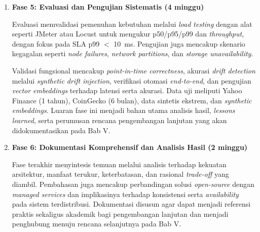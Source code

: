 \begin{enumerate}
    \vspace{0.5em}

    \item \textbf{Fase 5: Evaluasi dan Pengujian Sistematis (4 minggu)}
    
    Evaluasi memvalidasi pemenuhan kebutuhan melalui \textit{load testing} dengan alat seperti JMeter atau Locust untuk mengukur p50/p95/p99 dan \textit{throughput}, dengan fokus pada SLA p99 $<$ 10~ms. Pengujian juga mencakup skenario kegagalan seperti \textit{node failures}, \textit{network partitions}, dan \textit{storage unavailability}.
    
    \vspace{0.5em}

    Validasi fungsional mencakup \textit{point-in-time correctness}, akurasi \textit{drift detection} melalui \textit{synthetic drift injection}, verifikasi otomasi \textit{end-to-end}, dan pengujian \textit{vector embeddings} terhadap latensi serta akurasi. Data uji meliputi Yahoo Finance (1 tahun), CoinGecko (6 bulan), data sintetis ekstrem, dan \textit{synthetic embeddings}. Luaran fase ini menjadi bahan utama analisis hasil, \textit{lessons learned}, serta perumusan rencana pengembangan lanjutan yang akan didokumentasikan pada Bab V.
    
    \vspace{0.5em}
    
    \item \textbf{Fase 6: Dokumentasi Komprehensif dan Analisis Hasil (2 minggu)}
    
    Fase terakhir menyintesis temuan melalui analisis terhadap kekuatan arsitektur, manfaat terukur, keterbatasan, dan rasional \textit{trade-off} yang diambil. Pembahasan juga mencakup perbandingan solusi \textit{open-source} dengan \textit{managed services} dan implikasinya terhadap konsistensi serta \textit{availability} pada sistem terdistribusi. Dokumentasi disusun agar dapat menjadi referensi praktis sekaligus akademik bagi pengembangan lanjutan dan menjadi penghubung menuju rencana selanjutnya pada Bab V.
\end{enumerate}